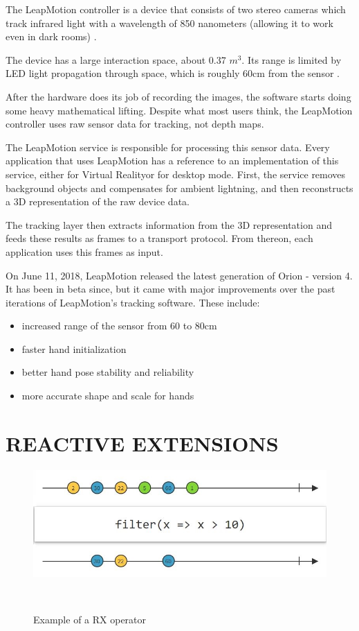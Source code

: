 \documentclass{sigchi}
\def\leap{LeapMotion}
\def\vr{Virtual Reality}
\begin{document}
The \leap{} controller is a device that consists of two stereo cameras which track infrared light with a wavelength of 850 nanometers (allowing it to work even in dark rooms) \cite{LeapArticle}.


The device has a large interaction space, about 0.37 $m^3$. Its range is limited by LED light propagation through space, which is roughly 60cm from the sensor \cite{LeapArticle}.


After the hardware does its job of recording the images, the software starts doing some heavy mathematical lifting. Despite what most users think, the \leap{} controller uses raw sensor data for tracking, not depth maps.


The \leap{} service is responsible for processing this sensor data. Every application that uses \leap{} has a reference to an implementation of this service, either for \vr or for desktop mode. First, the service removes background objects and compensates for ambient lightning, and then reconstructs a 3D representation of the raw device data.


The tracking layer then extracts information from the 3D representation and feeds these results as frames to a transport protocol. From thereon, each application uses this frames as input.


On June 11, 2018, \leap{} released the latest generation of Orion - version 4. It has been in beta since, but it came with major improvements over the past iterations of \leap{}'s tracking software. These include:

\begin{itemize}
  \item increased range of the sensor from 60 to 80cm
  \item faster hand initialization
  \item better hand pose stability and reliability
  \item more accurate shape and scale for hands
\end{itemize}

\section{REACTIVE EXTENSIONS}

\begin{figure}[H]
  \centering
  \includegraphics[width=0.9\columnwidth]{figures/RX_filter}
  \caption{Example of a RX operator}~\label{fig:figure2}
\end{figure}
  
\end{document}
